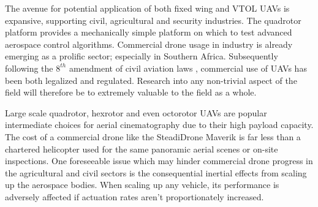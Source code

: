 \par
The avenue for potential application of both fixed wing and VTOL UAVs is expansive, supporting civil\cite{civilquadcopter}, agricultural\cite{agriculturequadcopter} and security\cite{videosurveillancequadcopter} industries. The quadrotor platform provides a mechanically simple platform on which to test advanced aerospace control algorithms. Commercial drone usage in industry is already emerging as a prolific sector; especially in Southern Africa. Subsequently following the $8^{th}$ amendment of civil aviation laws \cite{dronelaw}, commercial use of UAVs has been both legalized and regulated. Research into any non-trivial aspect of the field will therefore be to extremely valuable to the field as a whole. 
\par
Large scale quadrotor, hexrotor and even octorotor UAVs are popular intermediate choices for aerial cinematography due to their high payload capacity.  The cost of a commercial drone like the SteadiDrone Maverik \cite{steadidrone} is far less than a chartered helicopter used for the same panoramic aerial scenes or on-site inspections. One foreseeable issue which may hinder commercial drone progress in the agricultural and civil sectors is the consequential inertial effects from scaling up the aerospace bodies. When scaling up any vehicle, its performance is adversely affected if actuation rates aren't proportionately increased.

